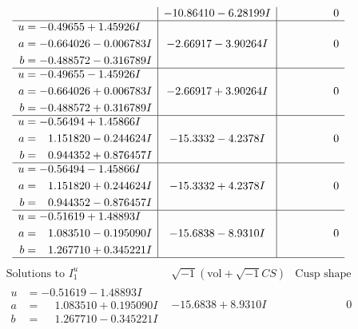 \documentclass[1p]{elsarticle_modified}
\theoremstyle{definition}
\newcommand{\I}{\sqrt{-1}}
\begin{document}
$$\begin{array}{c|c|c}
 & -10.86410 - 6.28199 I & \phantom{-0.000000 } 0 \\ \hline\begin{aligned}
u &= -0.49655 + 1.45926 I \\
a &= -0.664026 - 0.006783 I \\
b &= -0.488572 - 0.316789 I\end{aligned}
 & -2.66917 - 3.90264 I & \phantom{-0.000000 } 0 \\ \hline\begin{aligned}
u &= -0.49655 - 1.45926 I \\
a &= -0.664026 + 0.006783 I \\
b &= -0.488572 + 0.316789 I\end{aligned}
 & -2.66917 + 3.90264 I & \phantom{-0.000000 } 0 \\ \hline\begin{aligned}
u &= -0.56494 + 1.45866 I \\
a &= \phantom{-}1.151820 - 0.244624 I \\
b &= \phantom{-}0.944352 + 0.876457 I\end{aligned}
 & -15.3332 - 4.2378 I & \phantom{-0.000000 } 0 \\ \hline\begin{aligned}
u &= -0.56494 - 1.45866 I \\
a &= \phantom{-}1.151820 + 0.244624 I \\
b &= \phantom{-}0.944352 - 0.876457 I\end{aligned}
 & -15.3332 + 4.2378 I & \phantom{-0.000000 } 0 \\ \hline\begin{aligned}
u &= -0.51619 + 1.48893 I \\
a &= \phantom{-}1.083510 - 0.195090 I \\
b &= \phantom{-}1.267710 + 0.345221 I\end{aligned}
 & -15.6838 - 8.9310 I & \phantom{-0.000000 } 0\\
 \hline 
 \end{array}$$\newpage$$\begin{array}{c|c|c}  
\text{Solutions to }I^u_{1}& \I (\text{vol} + \sqrt{-1}CS) & \text{Cusp shape}\\
 \hline 
\begin{aligned}
u &= -0.51619 - 1.48893 I \\
a &= \phantom{-}1.083510 + 0.195090 I \\
b &= \phantom{-}1.267710 - 0.345221 I\end{aligned}
 & -15.6838 + 8.9310 I & \phantom{-0.000000 } 0 \\ \hline\begin{aligned}

\end{aligned}
\end{array}$$
\end{document}
